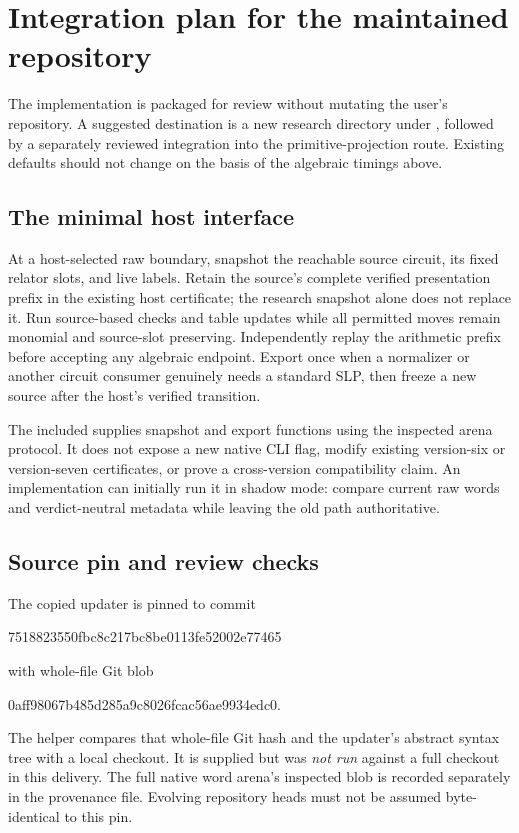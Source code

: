 \documentclass[11pt,letterpaper]{article}
\theoremstyle{definition}
\theoremstyle{remark}\newtheorem{remark}[theorem]{Remark}
\begin{document}
\section{Integration plan for the maintained repository}
\label{sec:integration}

The implementation is packaged for review without mutating the user's
repository. A suggested destination is a new research directory under
, followed by a separately reviewed
integration into the primitive-projection route. Existing defaults should not
change on the basis of the algebraic timings above.

\subsection{The minimal host interface}

At a host-selected raw boundary, snapshot the reachable source circuit, its
fixed relator slots, and live labels. Retain the source's complete verified
presentation prefix in the existing host certificate; the research snapshot
alone does not replace it. Run source-based checks and table updates while
all permitted moves remain monomial and source-slot preserving. Independently
replay the arithmetic prefix before accepting any algebraic endpoint. Export
once when a normalizer or another circuit consumer genuinely needs a standard
SLP, then freeze a new source after the host's verified transition.

The included  supplies snapshot and export functions
using the inspected arena protocol. It does not expose a new native CLI flag,
modify existing version-six or version-seven certificates, or prove a
cross-version compatibility claim. An implementation can initially run it in
shadow mode: compare current raw words and verdict-neutral metadata while
leaving the old path authoritative.

\subsection{Source pin and review checks}

The copied updater is pinned to commit
\begin{center}\small\ttfamily
7518823550fbc8c217bc8be0113fe52002e77465
\end{center}
with whole-file Git blob
\begin{center}\small\ttfamily
0aff98067b485d285a9c8026fcac56ae9934edc0.
\end{center}
The helper  compares that whole-file
Git hash and the updater's abstract syntax tree with a local checkout. It is
supplied but was \emph{not run} against a full checkout in this delivery.
The full native word arena's inspected blob is recorded separately in the
provenance file. Evolving repository heads must not be assumed byte-identical
to this pin.
\end{document}

